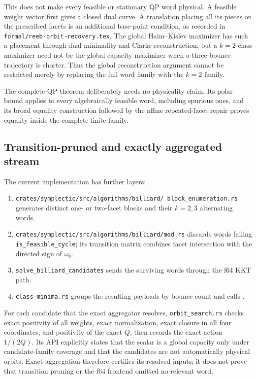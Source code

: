 This does not make every feasible or stationary QP word physical.  A feasible
weight vector first gives a closed dual curve.  A translation placing all its
pieces on the prescribed facets is an additional base-point condition, as
recorded in \texttt{formal/reeb-orbit-recovery.tex}.  The global Haim--Kislev
maximizer has such a placement through dual minimality and Clarke
reconstruction, but a \(k=2\) class maximizer need not be the global capacity
maximizer when a three-bounce trajectory is shorter.  Thus the global
reconstruction argument cannot be restricted merely by replacing the full
word family with the \(k=2\) family.

The complete-QP theorem deliberately needs no physicality claim.  Its polar
bound applies to every algebraically feasible word, including spurious ones,
and its broad equality construction followed by the affine repeated-facet
repair proves equality inside the complete finite family.

\subsection{Transition-pruned and exactly aggregated stream}
\label{subsec:product-two-bounce-stream}

The current implementation has further layers:
\begin{enumerate}
  \item
    \texttt{crates/symplectic/src/algorithms/billiard/%
    block\_enumeration.rs} generates distinct one- or two-facet blocks and
    their \(k=2,3\) alternating words.
  \item
    \texttt{crates/symplectic/src/algorithms/billiard/mod.rs} discards words
    failing \texttt{is\_feasible\_cycle}; its transition matrix combines
    facet intersection with the directed sign of \(\omega_0\).
  \item
    \texttt{solve\_billiard\_candidates} sends the surviving words through
    the f64 KKT path.
  \item
    \texttt{class-minima.rs} groups the resulting payloads by bounce count
    and calls
    .
\end{enumerate}
For each candidate that the exact aggregator resolves,
\texttt{orbit\_search.rs} checks exact positivity of all weights, exact
normalization, exact closure in all four coordinates, and positivity of the
exact \(Q\), then records the exact action \(1/(2Q)\).  Its API explicitly
states that the scalar is a global capacity only under candidate-family
coverage and that the candidates are not automatically physical orbits.
Exact aggregation therefore certifies its resolved inputs; it does not prove
that transition pruning or the f64 frontend omitted no relevant word.

